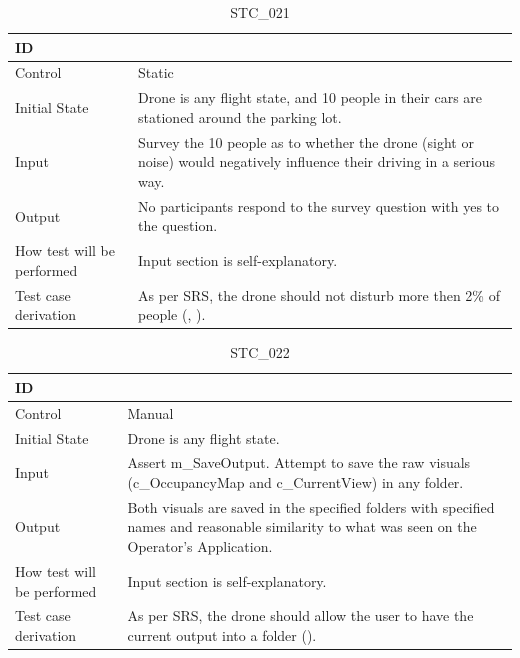 \documentclass[12pt, titlepage]{article}
\begin{document}
\begin{table}[!h]
\begin{center}
\caption {STC\_021}
\label{tab:STC_021}
\begin{tabular}{ | m{3.2cm} | m{12.2cm} | } 
\hline
ID & \nameref{tab:STC_021} \\ 
\hline
Control & Static \\ 
\hline
Initial State & Drone is any flight state, and 10 people in their cars are stationed around the parking lot. \\ 
\hline
Input & Survey the 10 people as to whether the drone (sight or noise) would negatively influence their driving in a serious way. \\ 
\hline
Output &  No participants respond to the survey question with yes to the question. \\ 
\hline
How test will be performed & Input section is self-explanatory. \\ 
\hline
Test case derivation & As per SRS, the drone should not disturb more then 2\% of people (\nameref{SAFE_004}, \nameref{SAFE_001}).
 \\ 
\hline
\end{tabular}
\end{center}
\end{table}

\begin{table}[!h]
\begin{center}
\caption {STC\_022}
\label{tab:STC_022}
\begin{tabular}{ | m{3.2cm} | m{12.2cm} | } 
\hline
ID & \nameref{tab:STC_022} \\ 
\hline
Control & Manual \\ 
\hline
Initial State & Drone is any flight state. \\ 
\hline
Input & Assert m_SaveOutput. Attempt to save the raw visuals (c_OccupancyMap and c_CurrentView) in any folder.
 \\ 
\hline
Output &  Both visuals are saved in the specified folders with specified names and reasonable similarity to what was seen on the Operator's Application. \\ 
\hline
How test will be performed & Input section is self-explanatory. \\ 
\hline
Test case derivation & As per SRS, the drone should allow the user to have the current output into a folder (\nameref{USE_002}).
 \\ 
\hline
\end{tabular}
\end{center}
\end{table}
\end{document}
